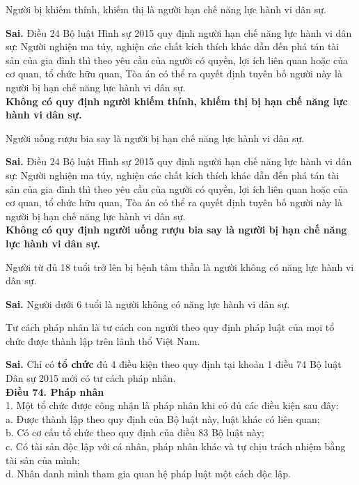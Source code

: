 \begin{ques}
Người bị khiếm thính, khiếm thị là người hạn chế năng lực hành vi dân sự.
\end{ques}
\begin{ans}
\textbf{Sai.} Điều 24 Bộ luật Hình sự 2015 quy định người hạn chế năng lực hành vi dân sự: Người nghiện ma túy, nghiện các chất kích thích khác dẫn đến phá tán tài sản của gia đình thì theo yêu cầu của người có quyền, lợi ích liên quan hoặc của cơ quan, tổ chức hữu quan, Tòa án có thể ra quyết định tuyên bố người này là người bị hạn chế năng lực hành vi dân sự. \\
\textbf{Không có quy định người khiếm thính, khiếm thị bị hạn chế năng lực hành vi dân sự.}
\end{ans}

\begin{ques}
Người uống rượu bia say là người bị hạn chế năng lực hành vi dân sự.
\end{ques}
\begin{ans}
\textbf{Sai.} Điều 24 Bộ luật Hình sự 2015 quy định người hạn chế năng lực hành vi dân sự: Người nghiện ma túy, nghiện các chất kích thích khác dẫn đến phá tán tài sản của gia đình thì theo yêu cầu của người có quyền, lợi ích liên quan hoặc của cơ quan, tổ chức hữu quan, Tòa án có thể ra quyết định tuyên bố người này là người bị hạn chế năng lực hành vi dân sự. \\
\textbf{Không có quy định người uống rượu bia say là người bị hạn chế năng lực hành vi dân sự.}
\end{ans}

\begin{ques}
Người từ đủ 18 tuổi trở lên bị bệnh tâm thần là người không có năng lực hành vi dân sự.
\end{ques}
\begin{ans}
\textbf{Sai.} Người dưới 6 tuổi là người không có năng lực hành vi dân sự.
\end{ans}

\begin{ques}
Tư cách pháp nhân là tư cách con người theo quy định pháp luật của mọi tổ chức được thành lập trên lãnh thổ Việt Nam.
\end{ques}
\begin{ans}
\textbf{Sai.} Chỉ có \textbf{tổ chức} đủ 4 điều kiện theo quy định tại khoản 1 điều 74 Bộ luật Dân sự 2015 mới có tư cách pháp nhân.\\
\textbf{Điều 74. Pháp nhân}\\
1. Một tổ chức được công nhận là pháp nhân khi có đủ các điều kiện sau đây:\\
a. Được thành lập theo quy định của Bộ luật này, luật khác có liên quan;\\
b. Có cơ cấu tổ chức theo quy định của điều 83 Bộ luật này;\\
c. Có tài sản độc lập với cá nhân, pháp nhân khác và tự chịu trách nhiệm bằng tài sản của mình;\\
d. Nhân danh mình tham gia quan hệ pháp luật một cách độc lập.
\end{ans}

